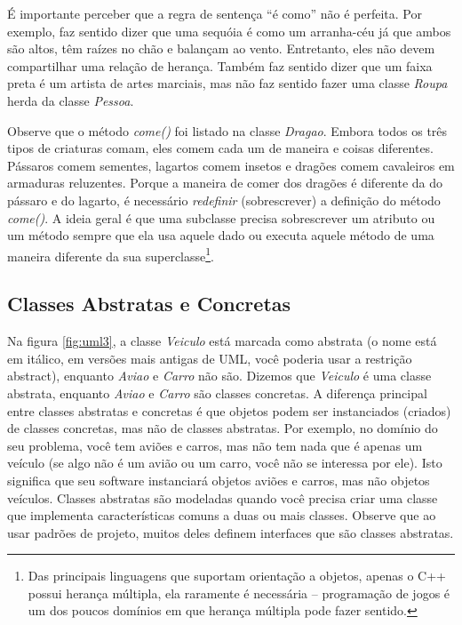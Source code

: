 \documentclass[
	11pt,				%
	openright,
	twoside,			%
	a4paper,			%
	english,			%
	french,
	brazil,				%
	sumario=tradicional
	]{abntex2}
\begin{document}
É importante perceber que a regra de sentença ``é como'' não é perfeita. Por exemplo, faz sentido dizer que uma sequóia é como um arranha-céu já que ambos são altos, têm raízes no chão e balançam ao vento. Entretanto, eles não devem compartilhar uma relação de herança. Também faz sentido dizer que um faixa preta é um artista de artes marciais, mas não faz sentido fazer uma classe \emph{Roupa} herda da classe \emph{Pessoa}.

Observe que o método \emph{come()} foi listado na classe \emph{Dragao}. Embora todos os três tipos de criaturas comam, eles comem cada um de maneira e coisas diferentes. Pássaros comem sementes, lagartos comem insetos e dragões comem cavaleiros em armaduras reluzentes. Porque a maneira de comer dos dragões é diferente da do pássaro e do lagarto, é necessário \textit{redefinir} (sobrescrever) a definição do método \emph{come()}. A ideia geral é que uma subclasse precisa sobrescrever um atributo ou um método sempre que ela usa aquele dado ou executa aquele método de uma maneira diferente da sua superclasse\footnote{Das principais linguagens que suportam orientação a objetos, apenas o C++ possui herança múltipla, ela raramente é necessária -- programação de jogos é um dos poucos domínios em que herança múltipla pode fazer sentido.}.

\subsection{Classes Abstratas e Concretas}

Na figura \ref{fig:uml3}, a classe \emph{Veiculo} está marcada como abstrata (o nome está em itálico, em versões mais antigas de UML, você poderia usar a restrição {abstract}), enquanto \emph{Aviao} e \emph{Carro} não são. Dizemos que 
\emph{Veiculo} é uma classe abstrata, enquanto \emph{Aviao} e \emph{Carro} são classes concretas. A diferença principal entre classes abstratas e concretas é que objetos podem ser instanciados (criados) de classes concretas, mas não de classes abstratas. Por exemplo, no domínio do seu problema, você tem aviões e carros, mas não tem nada que é apenas um veículo (se algo não é um avião ou um carro, você não se interessa por ele). Isto significa que seu software instanciará objetos aviões e carros, mas não objetos veículos. Classes abstratas são modeladas quando você precisa criar uma classe que implementa características comuns a duas ou mais classes. Observe que ao usar padrões de projeto, muitos deles definem interfaces que são classes abstratas.
\end{document}
